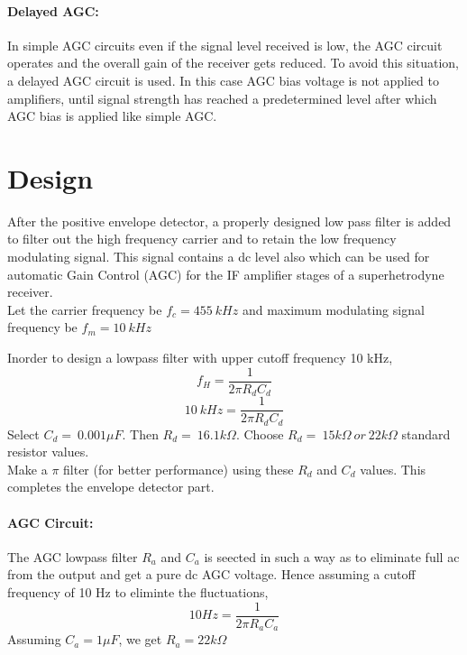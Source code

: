 \paragraph{Delayed AGC:}In simple AGC circuits even if the signal level received is low, the AGC circuit operates and the overall gain of the receiver gets reduced. To avoid this situation, a delayed AGC circuit is used. In this case AGC bias voltage is not applied to amplifiers, until signal strength has reached a predetermined level after which AGC bias is applied like simple AGC.

\section*{Design}

After the positive envelope detector, a properly designed low pass filter is added to filter out the high frequency carrier and to retain the low frequency modulating signal. This signal contains a dc level also which can be used for automatic Gain Control (AGC) for the IF amplifier stages of a superhetrodyne receiver.\\

\noindent Let the carrier frequency be $f_c=455\ kHz$ and maximum modulating signal frequency be $f_m=10\ kHz$

\noindent Inorder to design a lowpass filter with upper cutoff frequency 10 kHz,
\begin{equation}
f_H=\frac{1}{2\pi R_dC_d}
\end{equation}
\begin{equation}
10\ kHz=\frac{1}{2\pi R_dC_d}
\end{equation}
\noindent Select $C_d=\ 0.001 \mu F$. Then $R_d=\ 16.1k\Omega$.
Choose $R_d=\ 15k\Omega \ or\ 22k\Omega$ standard resistor values.\\

\noindent Make a $\pi$ filter (for better performance) using these $R_d$ and $C_d$ values. This completes the envelope detector part.
\paragraph{AGC Circuit:} The AGC lowpass filter $R_a$ and $C_a$ is seected in such a way as to eliminate full ac from the output and get a pure dc AGC voltage. 
Hence assuming a cutoff frequency of 10 Hz to eliminte the fluctuations,
\begin{equation}
10 Hz= \frac{1}{2\pi R_aC_a}
\end{equation}
\noindent Assuming $C_a=1 \mu F$, we get $R_a=22 k \Omega$

